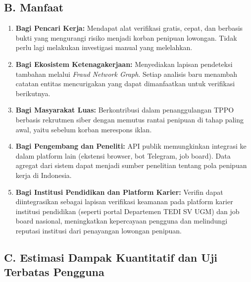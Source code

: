 \documentclass[12pt,a4paper]{article}
\begin{document}
\subsection*{B. Manfaat}

\begin{enumerate}[label=\textbf{\arabic*.}]
\item \textbf{Bagi Pencari Kerja:} Mendapat alat verifikasi gratis, cepat, dan berbasis bukti yang
      mengurangi risiko menjadi korban penipuan lowongan. Tidak perlu lagi melakukan investigasi
      manual yang melelahkan.

\item \textbf{Bagi Ekosistem Ketenagakerjaan:} Menyediakan lapisan pendeteksi tambahan melalui
      \textit{Fraud Network Graph}. Setiap analisis baru menambah catatan entitas mencurigakan
      yang dapat dimanfaatkan untuk verifikasi berikutnya.

\item \textbf{Bagi Masyarakat Luas:} Berkontribusi dalam penanggulangan TPPO berbasis
      rekrutmen siber dengan memutus rantai penipuan di tahap paling awal, yaitu sebelum
      korban merespons iklan.

\item \textbf{Bagi Pengembang dan Peneliti:} API publik memungkinkan integrasi ke dalam platform
      lain (ekstensi browser, bot Telegram, job board). Data agregat dari sistem dapat menjadi
      sumber penelitian tentang pola penipuan kerja di Indonesia.

\item \textbf{Bagi Institusi Pendidikan dan Platform Karier:} Verifin dapat diintegrasikan sebagai
      lapisan verifikasi keamanan pada platform karier institusi pendidikan (seperti portal Departemen TEDI SV UGM) dan job board
      nasional, meningkatkan kepercayaan pengguna dan melindungi reputasi institusi dari
      penayangan lowongan penipuan.
\end{enumerate}

\subsection*{\colorbox{yellow!40}{\textbf{C. Estimasi Dampak Kuantitatif dan Uji Terbatas Pengguna}}}
{}
\end{document}
